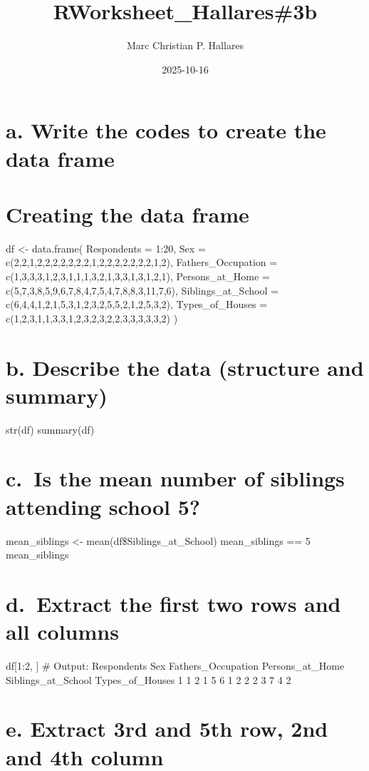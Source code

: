\documentclass[
]{article}
\title{RWorksheet\_Hallares\#3b}
\author{Marc Christian P. Hallares}
\date{2025-10-16}
\begin{document}
\maketitle

\section{a. Write the codes to create the data
frame}\label{a.-write-the-codes-to-create-the-data-frame}

\section{Creating the data frame}\label{creating-the-data-frame}

df \textless- data.frame( Respondents = 1:20, Sex =
c(2,2,1,2,2,2,2,2,2,2,1,2,2,2,2,2,2,2,1,2), Fathers\_Occupation =
c(1,3,3,3,1,2,3,1,1,1,3,2,1,3,3,1,3,1,2,1), Persons\_at\_Home =
c(5,7,3,8,5,9,6,7,8,4,7,5,4,7,8,8,3,11,7,6), Siblings\_at\_School =
c(6,4,4,1,2,1,5,3,1,2,3,2,5,5,2,1,2,5,3,2), Types\_of\_Houses =
c(1,2,3,1,1,3,3,1,2,3,2,3,2,2,3,3,3,3,3,2) )

\section{b. Describe the data (structure and
summary)}\label{b.-describe-the-data-structure-and-summary}

str(df) summary(df)

\section{c.~Is the mean number of siblings attending school
5?}\label{c.-is-the-mean-number-of-siblings-attending-school-5}

mean\_siblings \textless- mean(df\$Siblings\_at\_School) mean\_siblings
== 5\\
mean\_siblings

\section{d.~Extract the first two rows and all
columns}\label{d.-extract-the-first-two-rows-and-all-columns}

df{[}1:2, {]} \# Output: Respondents Sex Fathers\_Occupation
Persons\_at\_Home Siblings\_at\_School Types\_of\_Houses 1 1 2 1 5 6 1 2
2 2 3 7 4 2

\section{e. Extract 3rd and 5th row, 2nd and 4th
column}\label{e.-extract-3rd-and-5th-row-2nd-and-4th-column}
\end{document}
